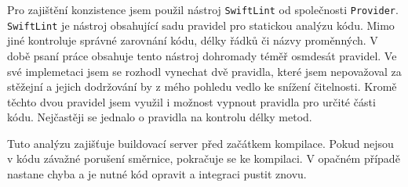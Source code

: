Pro zajištění konzistence jsem použil nástroj \texttt{SwiftLint} od společnosti \texttt{Provider}.
\texttt{SwiftLint} je nástroj obsahující sadu pravidel pro statickou analýzu kódu.
Mimo jiné kontroluje správné zarovnání kódu, délky řádků či názvy proměnných.
V době psaní práce obsahuje tento nástroj dohromady téměř osmdesát pravidel.
Ve své implemetaci jsem se rozhodl vynechat dvě pravidla, které jsem nepovažoval za stěžejní a jejich dodržování by z mého pohledu vedlo ke snížení čitelnosti.
Kromě těchto dvou pravidel jsem využil i možnost vypnout pravidla pro určité části kódu.
Nejčastěji se jednalo o pravidla na kontrolu délky metod.

Tuto analýzu zajišťuje buildovací server před začátkem kompilace.
Pokud nejsou v kódu závažné porušení směrnice, pokračuje se ke kompilaci.
V opačném případě nastane chyba a je nutné kód opravit a integraci pustit znovu.
